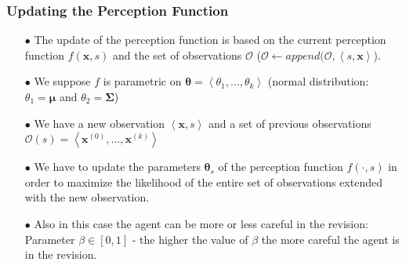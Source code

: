 \documentclass{beamer}
\def\bmu{\pmb{\mu}}
\def\bSigma{\pmb{\Sigma}}
\def\bx{\pmb{x}}
\def\O{\mathcal{O}}
\def\prm{\pmb{\theta}}
\begin{document}
\begin{frame} 
  \frametitle{Updating the Perception Function} 

\begin{itemize}
\item[$\bullet$]
The update of the perception function is based on the 
{\color {red} current
perception function $f(\bx,s)$} and 
{\color {red} the set of observations $\O$} ($\O \gets append(\O,\left<s,\bx\right>$). 
\pause
\item[$\bullet$]
We suppose 
{\color {red} $f$ is parametric on $\prm=\left<\theta_1,\dots,\theta_k\right>$}
(normal distribution: 
{\color {red} 
$\theta_1=\bmu$ and $\theta_2=\bSigma$}) 
\pause
\item[$\bullet$]
We have a new observation $\left<\bx,s\right>$ and a set of previous
observations $\O(s)=\left<\bx^{(0)},\dots, \bx^{(k)}\right>$ \pause
\item[$\bullet$]
We have to 
{\color {red} 
update the parameters $\prm_s$} of
the perception function $f(\cdot,s)$ in order to
{\color {red}  maximize the likelihood} of the entire set of observations extended
with the new observation.
\pause
\item[$\bullet$]
Also in this case the agent can be more or less
careful in the revision: Parameter 
{\color {red}  $\beta\in[0,1]$} -  the higher the value of $\beta$ the more careful the agent is in the revision.
\end{itemize}

\end{frame}
\end{document}
